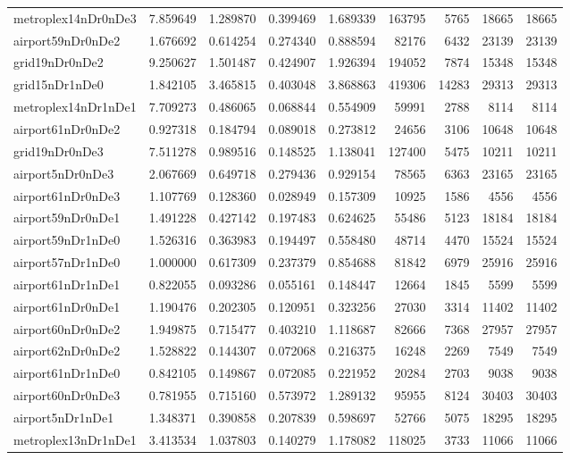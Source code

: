 \begin{longtable}{|l|r|r|r|r|r|r|r|r|}
metroplex14nDr0nDe3 & 7.859649 & 1.289870 & 0.399469 & 1.689339 & 163795 & 5765 & 18665 & 18665 \\
airport59nDr0nDe2 & 1.676692 & 0.614254 & 0.274340 & 0.888594 & 82176 & 6432 & 23139 & 23139 \\
grid19nDr0nDe2 & 9.250627 & 1.501487 & 0.424907 & 1.926394 & 194052 & 7874 & 15348 & 15348 \\
grid15nDr1nDe0 & 1.842105 & 3.465815 & 0.403048 & 3.868863 & 419306 & 14283 & 29313 & 29313 \\
metroplex14nDr1nDe1 & 7.709273 & 0.486065 & 0.068844 & 0.554909 & 59991 & 2788 & 8114 & 8114 \\
airport61nDr0nDe2 & 0.927318 & 0.184794 & 0.089018 & 0.273812 & 24656 & 3106 & 10648 & 10648 \\
grid19nDr0nDe3 & 7.511278 & 0.989516 & 0.148525 & 1.138041 & 127400 & 5475 & 10211 & 10211 \\
airport5nDr0nDe3 & 2.067669 & 0.649718 & 0.279436 & 0.929154 & 78565 & 6363 & 23165 & 23165 \\
airport61nDr0nDe3 & 1.107769 & 0.128360 & 0.028949 & 0.157309 & 10925 & 1586 & 4556 & 4556 \\
airport59nDr0nDe1 & 1.491228 & 0.427142 & 0.197483 & 0.624625 & 55486 & 5123 & 18184 & 18184 \\
airport59nDr1nDe0 & 1.526316 & 0.363983 & 0.194497 & 0.558480 & 48714 & 4470 & 15524 & 15524 \\
airport57nDr1nDe0 & 1.000000 & 0.617309 & 0.237379 & 0.854688 & 81842 & 6979 & 25916 & 25916 \\
airport61nDr1nDe1 & 0.822055 & 0.093286 & 0.055161 & 0.148447 & 12664 & 1845 & 5599 & 5599 \\
airport61nDr0nDe1 & 1.190476 & 0.202305 & 0.120951 & 0.323256 & 27030 & 3314 & 11402 & 11402 \\
airport60nDr0nDe2 & 1.949875 & 0.715477 & 0.403210 & 1.118687 & 82666 & 7368 & 27957 & 27957 \\
airport62nDr0nDe2 & 1.528822 & 0.144307 & 0.072068 & 0.216375 & 16248 & 2269 & 7549 & 7549 \\
airport61nDr1nDe0 & 0.842105 & 0.149867 & 0.072085 & 0.221952 & 20284 & 2703 & 9038 & 9038 \\
airport60nDr0nDe3 & 0.781955 & 0.715160 & 0.573972 & 1.289132 & 95955 & 8124 & 30403 & 30403 \\
airport5nDr1nDe1 & 1.348371 & 0.390858 & 0.207839 & 0.598697 & 52766 & 5075 & 18295 & 18295 \\
metroplex13nDr1nDe1 & 3.413534 & 1.037803 & 0.140279 & 1.178082 & 118025 & 3733 & 11066 & 11066 \\

\end{longtable}
